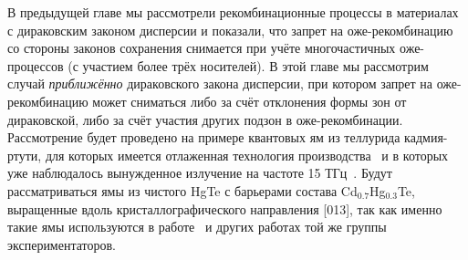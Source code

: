 В предыдущей главе мы рассмотрели рекомбинационные процессы в материалах с дираковским законом дисперсии и показали, что запрет на оже-рекомбинацию со стороны законов сохранения снимается при учёте многочастичных оже-процессов (с участием более трёх носителей). В этой главе мы рассмотрим случай \emph{приближённо} дираковского закона дисперсии, при котором запрет на оже-рекомбинацию может сниматься либо за счёт отклонения формы зон от дираковской, либо за счёт участия других подзон в оже-рекомбинации. Рассмотрение будет проведено на примере квантовых ям из теллурида кадмия-ртути, для которых имеется отлаженная технология производства~\cite{HgCdTe-technology} и в которых уже наблюдалось вынужденное излучение на частоте 15 ТГц~\cite{HgCdTe-stimulated_emission}. Будут рассматриваться ямы из чистого HgTe с барьерами состава Cd$_{0.7}$Hg$_{0.3}$Te, выращенные вдоль кристаллографического направления [013], так как именно такие ямы используются в работе~\cite{HgCdTe-stimulated_emission} и других работах той же группы экспериментаторов.